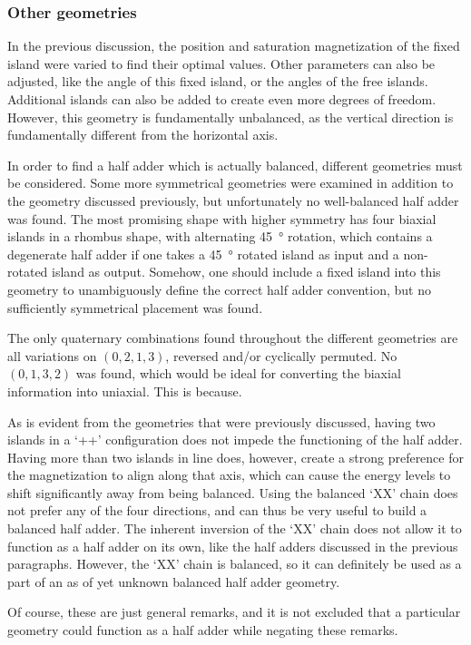 \documentclass[11pt,a4paper,english]{article}
\begin{document}
\subsubsection{Other geometries}
In the previous discussion, the position and saturation magnetization of the fixed island were varied to find their optimal values. Other parameters can also be adjusted, like the angle of this fixed island, or the angles of the free islands. Additional islands can also be added to create even more degrees of freedom. However, this geometry is fundamentally unbalanced, as the vertical direction is fundamentally different from the horizontal axis. \par
In order to find a half adder which is actually balanced, different geometries must be considered. Some more symmetrical geometries were examined in addition to the geometry discussed previously, but unfortunately no well-balanced half adder was found. The most promising shape with higher symmetry has four biaxial islands in a rhombus shape, with alternating \SI{45}{\degree} rotation, which contains a degenerate half adder if one takes a \SI{45}{\degree} rotated island as input and a non-rotated island as output. Somehow, one should include a fixed island into this geometry to unambiguously define the correct half adder convention, but no sufficiently symmetrical placement was found. \par
The only quaternary combinations found throughout the different geometries are all variations on $(0,2,1,3)$, reversed and/or cyclically permuted. No $(0,1,3,2)$ was found, which would be ideal for converting the biaxial information into uniaxial. This is because. \par %
As is evident from the geometries that were previously discussed, having two islands in a `++' configuration does not impede the functioning of the half adder. Having more than two islands in line does, however, create a strong preference for the magnetization to align along that axis, which can cause the energy levels to shift significantly away from being balanced. Using the balanced `XX' chain does not prefer any of the four directions, and can thus be very useful to build a balanced half adder. The inherent inversion of the `XX' chain does not allow it to function as a half adder on its own, like the half adders discussed in the previous paragraphs. However, the `XX' chain is balanced, so it can definitely be used as a part of an as of yet unknown balanced half adder geometry. \par
Of course, these are just general remarks, and it is not excluded that a particular geometry could function as a half adder while negating these remarks.
\end{document}
